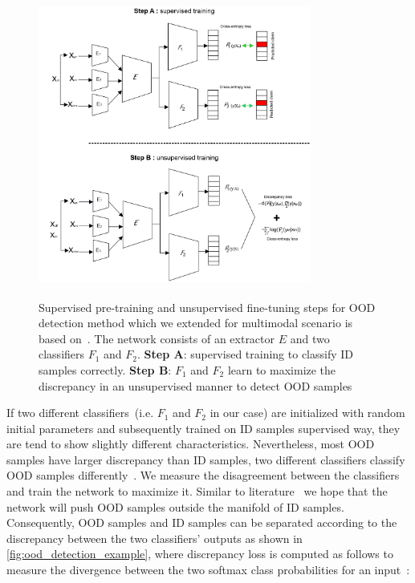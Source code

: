 \begin{figure}[htp!]
    \centering
    \includegraphics[width=0.8\textwidth,height=100mm]{images/OOD_1.png}
    \caption{Supervised pre-training and unsupervised fine-tuning steps for OOD detection method which we extended for multimodal scenario is based on~\cite{yu2019unsupervised}. The network consists of an extractor $E$ and two classifiers $F_{1}$ and $F_{2}$. \textbf{Step A}: supervised training to classify ID samples correctly. \textbf{Step B}: $F_{1}$ and $F_{2}$ learn to maximize the discrepancy in an unsupervised manner to detect OOD samples}
    \label{fig:ood_network}
    \vspace{-2mm}
\end{figure}

\hspace*{3.5mm} If two different classifiers~(i.e. $F_{1}$ and $F_{2}$ in our case) are initialized with random initial parameters and subsequently trained on ID samples supervised way, they are tend to show slightly different characteristics. Nevertheless, most OOD samples have larger discrepancy than ID samples, two different classifiers classify OOD samples differently~\cite{OOD19}. 
We measure the disagreement between the classifiers and train the network to maximize it. Similar to literature~\cite{OOD19} we hope that the network will push OOD samples outside the manifold of ID samples. Consequently, OOD samples and ID samples can be separated according to the discrepancy between the two classifiers’ outputs as shown in \cref{fig:ood_detection_example}, where discrepancy loss is computed as follows to measure the divergence between the two softmax class probabilities for an input~\cite{OOD19}: 

